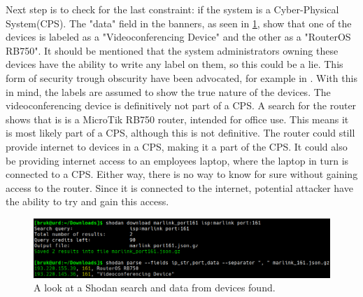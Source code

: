 Next step is to check for the last constraint: if the system is a Cyber-Physical System(CPS). The "data" field in the banners, as seen in \cref{fig:marlink_traceroute_data}, show that one of the devices is labeled as a "Videoconferencing Device" and the other as a "RouterOS RB750". It should be mentioned that the system administrators owning these devices have the ability to write any label on them, so this could be a lie. This form of security trough obscurity have been advocated, for example in \cite{bodenheim_butts_dunlap_mullins_2014}. With this in mind, the labels are assumed to show the true nature of the devices. 
The videoconferencing device is definitively not part of a CPS. 
A search for the router shows that is is a MicroTik RB750 router, intended for office use.\cite{RB750} This means it is most likely part of a CPS, although this is not definitive. The router could still provide internet to devices in a CPS, making it a part of the CPS. It could also be providing internet access to an employees laptop, where the laptop in turn is connected to a CPS. Either way, there is no way to know for sure without gaining access to the router. Since it is connected to the internet, potential attacker have the ability to try and gain this access.

\begin{figure} [H]
    \centering
    \includegraphics[scale=0.4]{Figurer/marlink_161_data.png}
    \caption{A look at a Shodan search and data from devices found.}
    \label{fig:marlink_traceroute_data}
\end{figure}

\newpage
